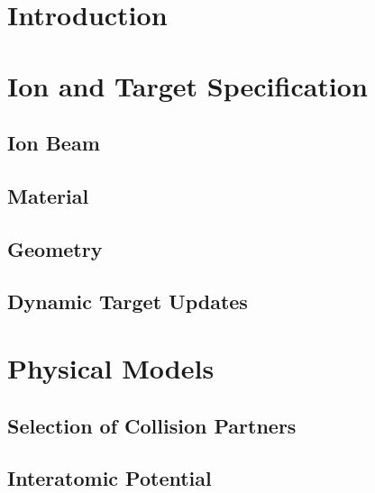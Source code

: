 \documentclass[twoside,12pt]{book}
\begin{document}
%
%
%

%
%
\begin{titlepage}

\end{titlepage}
%
%
\tableofcontents
\thispagestyle{empty}
%
%
\chapter{Introduction}
\label{k:intro}

%
%
\chapter{Ion and Target Specification}
\label{k:obj}

%
\section{Ion Beam}
\label{s:beam}

%
\section{Material}
\label{s:mater}

%
\section{Geometry}
\label{s:geometry}

%
\section{Dynamic Target Updates}
\label{s:updates}

%
%
\chapter{Physical Models}
\label{k:phys}

%
\section{Selection of Collision Partners}
\label{s:coll}

%
\section{Interatomic Potential}
\label{s:pot}

%
\end{document}
